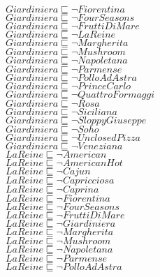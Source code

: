 \documentclass[a4paper,10pt]{article}
\begin{document}
 $Giardiniera \sqsubseteq  \lnot Fiorentina$\\ 
 $Giardiniera \sqsubseteq  \lnot FourSeasons$\\ 
 $Giardiniera \sqsubseteq  \lnot FruttiDiMare$\\ 
 $Giardiniera \sqsubseteq  \lnot LaReine$\\ 
 $Giardiniera \sqsubseteq  \lnot Margherita$\\ 
 $Giardiniera \sqsubseteq  \lnot Mushroom$\\ 
 $Giardiniera \sqsubseteq  \lnot Napoletana$\\ 
 $Giardiniera \sqsubseteq  \lnot Parmense$\\ 
 $Giardiniera \sqsubseteq  \lnot PolloAdAstra$\\ 
 $Giardiniera \sqsubseteq  \lnot PrinceCarlo$\\ 
 $Giardiniera \sqsubseteq  \lnot QuattroFormaggi$\\ 
 $Giardiniera \sqsubseteq  \lnot Rosa$\\ 
 $Giardiniera \sqsubseteq  \lnot Siciliana$\\ 
 $Giardiniera \sqsubseteq  \lnot SloppyGiuseppe$\\ 
 $Giardiniera \sqsubseteq  \lnot Soho$\\ 
 $Giardiniera \sqsubseteq  \lnot UnclosedPizza$\\ 
 $Giardiniera \sqsubseteq  \lnot Veneziana$\\ 
 $LaReine \sqsubseteq  \lnot American$\\ 
 $LaReine \sqsubseteq  \lnot AmericanHot$\\ 
 $LaReine \sqsubseteq  \lnot Cajun$\\ 
 $LaReine \sqsubseteq  \lnot Capricciosa$\\ 
 $LaReine \sqsubseteq  \lnot Caprina$\\ 
 $LaReine \sqsubseteq  \lnot Fiorentina$\\ 
 $LaReine \sqsubseteq  \lnot FourSeasons$\\ 
 $LaReine \sqsubseteq  \lnot FruttiDiMare$\\ 
 $LaReine \sqsubseteq  \lnot Giardiniera$\\ 
 $LaReine \sqsubseteq  \lnot Margherita$\\ 
 $LaReine \sqsubseteq  \lnot Mushroom$\\ 
 $LaReine \sqsubseteq  \lnot Napoletana$\\ 
 $LaReine \sqsubseteq  \lnot Parmense$\\ 
 $LaReine \sqsubseteq  \lnot PolloAdAstra$\\ 
\end{document}
